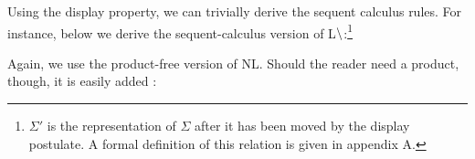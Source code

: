 Using the display property, we can trivially derive the sequent
calculus rules. For instance, below we derive the sequent-calculus
version of L$\mathbin{\backslash}$:\footnote{%
  $\Sigma'$ is the representation of $\Sigma$ after it has been moved
  by the display postulate. A formal definition of this relation is
  given in appendix A.
}
\begin{pfblock}
\end{pfblock}

\vspace*{1\baselineskip}

Again, we use the product-free version of NL. Should the reader need a
product, though, it is easily added \citep[see][]{moortgat2012}:
\begin{center}
  \begin{pfbox}
  \end{pfbox}
  \begin{pfbox}
  \end{pfbox}
\end{center}

